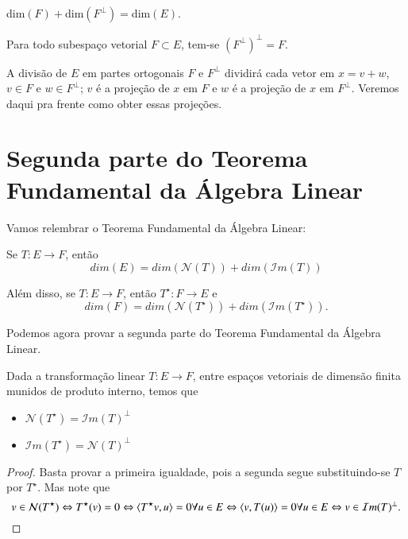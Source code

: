 \begin{coro}
  dim$(F)+$dim$(F^{\perp})=$dim$(E)$.
\end{coro}

\begin{coro}
  Para todo subespaço vetorial $F\subset E$, tem-se $(F^{\perp})^{\perp} = F$.
\end{coro}

A divisão de $E$ em partes ortogonais $F$ e $F^{\perp}$ dividirá cada vetor em $x=v+w$, $v\in F$ e $w\in F^{\perp}$; $v$ é a projeção de $x$ em $F$ e $w$ é a projeção de $x$ em $F^{\perp}$. Veremos daqui pra frente como obter essas projeções.

\section{Segunda parte do Teorema Fundamental da Álgebra Linear}

Vamos relembrar o Teorema Fundamental da Álgebra Linear:
\begin{teo}
	Se $T:E\to F$, então
	\begin{equation*}
    	dim(E) = dim({\mathcal{N}}(T)) + dim({\mathcal{I}}m(T))
    \end{equation*}
\end{teo}

Além disso, se $T:E\rightarrow F$, então $T^{\star}:F\rightarrow E$ e 
\begin{equation*}
	dim(F) = dim({\mathcal{N}}(T^{\star})) + dim({\mathcal{I}}m(T^{\star})).
\end{equation*}

Podemos agora provar a segunda parte do Teorema Fundamental da Álgebra Linear.

\begin{teo}
  Dada a transformação linear $T:E\rightarrow F$, entre espaços vetoriais de dimensão finita munidos de produto interno, temos que
  \begin{itemize}
  \item ${\mathcal{N}}(T^{\star}) = {\mathcal{I}}m(T)^{\perp}$
  \item ${\mathcal{I}}m(T^{\star}) = {\mathcal{N}}(T)^{\perp}$
  \end{itemize}
\end{teo}
\begin{proof}
Basta provar a primeira igualdade, pois a segunda segue substituindo-se $T$ por $T^{\star}$. Mas note que
\begin{equation*}
  v\in{\mathcal{N}}(T^{\star}) \Leftrightarrow T^{\star}(v)=0 \Leftrightarrow \langle T^{\star}v, u \rangle=0 \forall u\in E \Leftrightarrow \langle v, T(u) \rangle = 0 \forall u\in E \Leftrightarrow v\in {\mathcal{I}}m(T)^{\perp}.
\end{equation*}
\end{proof}

